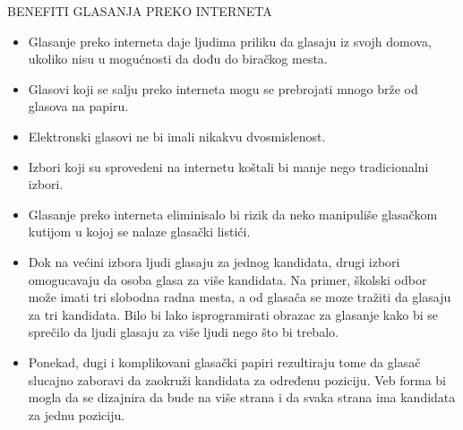 \documentclass[a4paper]{article}
\begin{document}
{\noindent BENEFITI GLASANJA PREKO INTERNETA
\begin{itemize}
\item Glasanje preko interneta daje ljudima priliku da glasaju iz svojh domova, ukoliko nisu u mogućnosti da dođu do biračkog mesta.
\item Glasovi koji se salju preko interneta mogu se prebrojati mnogo brže od glasova na papiru.
\item Elektronski glasovi ne bi imali nikakvu dvosmislenost.
\item Izbori koji su sprovedeni na internetu koštali bi manje nego tradicionalni izbori.
\item Glasanje preko interneta eliminisalo bi rizik da neko manipuliše glasačkom kutijom u kojoj se nalaze glasački listići.
\item Dok na većini izbora ljudi glasaju za jednog kandidata, drugi izbori omogucavaju da osoba glasa za više kandidata. Na primer, školski odbor može imati tri slobodna radna mesta, a od glasača se moze tražiti da glasaju za tri kandidata. Bilo bi lako isprogramirati obrazac za glasanje kako bi se sprečilo da ljudi glasaju za više ljudi nego što bi trebalo.
\item Ponekad, dugi i komplikovani glasački papiri rezultiraju tome da glasač slucajno zaboravi da zaokruži kandidata za određenu poziciju. Veb forma bi mogla da se dizajnira da bude na više strana i da svaka strana ima kandidata za jednu poziciju.
\end{itemize}


}
\end{document}
